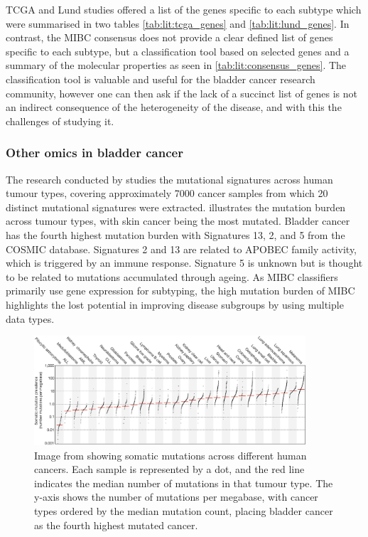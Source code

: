 TCGA and Lund studies offered a list of the genes specific to each subtype which were summarised in two tables \cref{tab:lit:tcga_genes} and \cref{tab:lit:lund_genes}. In contrast, the MIBC consensus does not provide a clear defined list of genes specific to each subtype, but a classification tool based on selected genes and a summary of the molecular properties as seen in \cref{tab:lit:consensus_genes}. The classification tool is valuable and useful for the bladder cancer research community, however one can then ask if the lack of a succinct list of genes is not an indirect consequence of the heterogeneity of the disease, and with this the challenges of studying it. 

\subsubsection{Other omics in bladder cancer}

The research conducted by \citet{Alexandrov2013-gi} studies the mutational signatures across human tumour types, covering approximately 7000 cancer samples from which 20 distinct mutational signatures were extracted.  illustrates the mutation burden across tumour types, with skin cancer being the most mutated. Bladder cancer has the fourth highest mutation burden with Signatures 13, 2, and 5 from the COSMIC database\cite{Tate2019-yj}. Signatures 2 and 13 are related to APOBEC family activity, which is triggered by an immune response. Signature 5 is unknown but is thought to be related to mutations accumulated through ageing. As MIBC classifiers primarily use gene expression for subtyping, the high mutation burden of MIBC highlights the lost potential in improving disease subgroups by using multiple data types.

\begin{figure}[!b]    
    \centering
\includegraphics[width=0.9\textwidth,height=0.9\textheight,keepaspectratio]{Sections/Lit_review/Resources/mut_sig_cancers.jpg}
    \caption{Image from \cite{Alexandrov2013-gi} showing somatic mutations across different human cancers. Each sample is represented by a dot, and the red line indicates the median number of mutations in that tumour type. The y-axis shows the number of mutations per megabase, with cancer types ordered by the median mutation count, placing bladder cancer as the fourth highest mutated cancer.}
    \label{fig:lit:cancer_mut_sig}
\end{figure}

